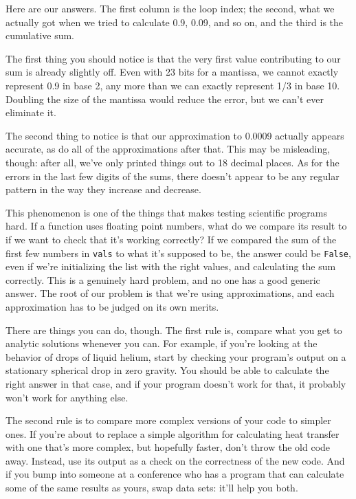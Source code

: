 \documentclass{book}
\begin{document}
Here are our answers. The first column is the loop index; the second,
what we actually got when we tried to calculate 0.9, 0.09, and so on,
and the third is the cumulative sum.

The first thing you should notice is that the very first value
contributing to our sum is already slightly off. Even with 23 bits for a
mantissa, we cannot exactly represent 0.9 in base 2, any more than we
can exactly represent 1/3 in base 10. Doubling the size of the mantissa
would reduce the error, but we can't ever eliminate it.

The second thing to notice is that our approximation to 0.0009 actually
appears accurate, as do all of the approximations after that. This may
be misleading, though: after all, we've only printed things out to 18
decimal places. As for the errors in the last few digits of the sums,
there doesn't appear to be any regular pattern in the way they increase
and decrease.

This phenomenon is one of the things that makes testing scientific
programs hard. If a function uses floating point numbers, what do we
compare its result to if we want to check that it's working correctly?
If we compared the sum of the first few numbers in \texttt{vals} to what
it's supposed to be, the answer could be \texttt{False}, even if we're
initializing the list with the right values, and calculating the sum
correctly. This is a genuinely hard problem, and no one has a good
generic answer. The root of our problem is that we're using
approximations, and each approximation has to be judged on its own
merits.

There are things you can do, though. The first rule is, compare what you
get to analytic solutions whenever you can. For example, if you're
looking at the behavior of drops of liquid helium, start by checking
your program's output on a stationary spherical drop in zero gravity.
You should be able to calculate the right answer in that case, and if
your program doesn't work for that, it probably won't work for anything
else.

The second rule is to compare more complex versions of your code to
simpler ones. If you're about to replace a simple algorithm for
calculating heat transfer with one that's more complex, but hopefully
faster, don't throw the old code away. Instead, use its output as a
check on the correctness of the new code. And if you bump into someone
at a conference who has a program that can calculate some of the same
results as yours, swap data sets: it'll help you both.
\end{document}
